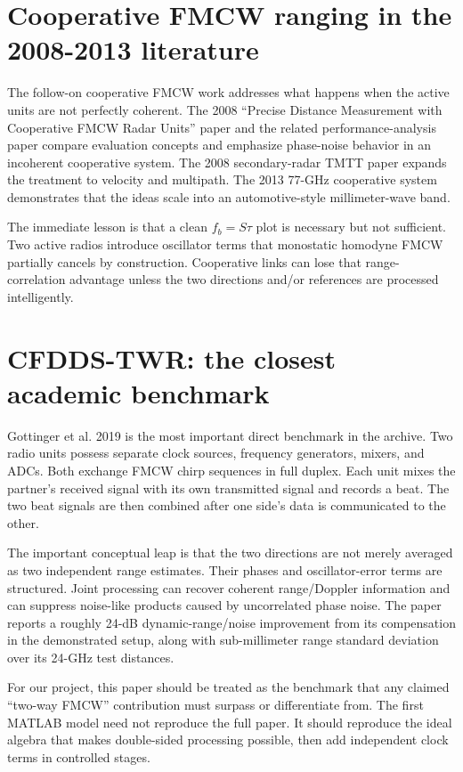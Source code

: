 \documentclass[11pt]{article}
\begin{document}
\section{Cooperative FMCW ranging in the 2008-2013 literature}
The follow-on cooperative FMCW work addresses what happens when the active units are not perfectly coherent. The 2008 ``Precise Distance Measurement with Cooperative FMCW Radar Units'' paper and the related performance-analysis paper compare evaluation concepts and emphasize phase-noise behavior in an incoherent cooperative system. The 2008 secondary-radar TMTT paper expands the treatment to velocity and multipath. The 2013 77-GHz cooperative system demonstrates that the ideas scale into an automotive-style millimeter-wave band.

The immediate lesson is that a clean $f_b=S\tau$ plot is necessary but not sufficient. Two active radios introduce oscillator terms that monostatic homodyne FMCW partially cancels by construction. Cooperative links can lose that range-correlation advantage unless the two directions and/or references are processed intelligently.

\section{CFDDS-TWR: the closest academic benchmark}
Gottinger et al. 2019 is the most important direct benchmark in the archive. Two radio units possess separate clock sources, frequency generators, mixers, and ADCs. Both exchange FMCW chirp sequences in full duplex. Each unit mixes the partner's received signal with its own transmitted signal and records a beat. The two beat signals are then combined after one side's data is communicated to the other.

The important conceptual leap is that the two directions are not merely averaged as two independent range estimates. Their phases and oscillator-error terms are structured. Joint processing can recover coherent range/Doppler information and can suppress noise-like products caused by uncorrelated phase noise. The paper reports a roughly 24-dB dynamic-range/noise improvement from its compensation in the demonstrated setup, along with sub-millimeter range standard deviation over its 24-GHz test distances.

For our project, this paper should be treated as the benchmark that any claimed ``two-way FMCW'' contribution must surpass or differentiate from. The first MATLAB model need not reproduce the full paper. It should reproduce the ideal algebra that makes double-sided processing possible, then add independent clock terms in controlled stages.
\end{document}
